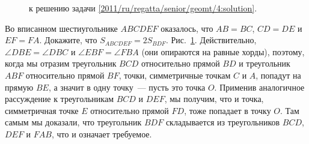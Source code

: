 \ifsolution
\begin{figure}\centering
    \caption{к решению задачи \ref{2011/ru/regatta/senior/geomt/4:solution}.}
    \label{2011/ru/regatta/senior/geomt/4:solution:fig}
\end{figure}%
\fi %

\problem
Во вписанном шестиугольнике $ABCDEF$ оказалось, что
$AB = BC$, $CD = DE$ и $EF = FA$.
Докажите, что $S_{ABCDEF} = 2 S_{BDF}$.
\solution
\label{2011/ru/regatta/senior/geomt/4:solution}%
Рис.~\ref{2011/ru/regatta/senior/geomt/4:solution:fig}.
Действительно, $\angle DBE = \angle DBC$ и $\angle EBF = \angle FBA$
(они опираются на равные хорды),
поэтому, когда мы отразим треугольник $BCD$ относительно прямой $BD$ и
треугольник $ABF$ относительно прямой $BF$, точки, симметричные точкам $C$ и
$A$, попадут на прямую $BE$, а значит в одну точку~--- пусть это точка $O$.
Применив аналогичное рассуждение к треугольникам $BCD$ и $DEF$, мы получим, что
и точка, симметричная точке $E$ относительно прямой $FD$, тоже попадает в точку
$O$.
Там самым мы доказали, что треугольник $BDF$ складывается из треугольников
$BCD$, $DEF$ и $FAB$, что и означает требуемое.
\endproblem
